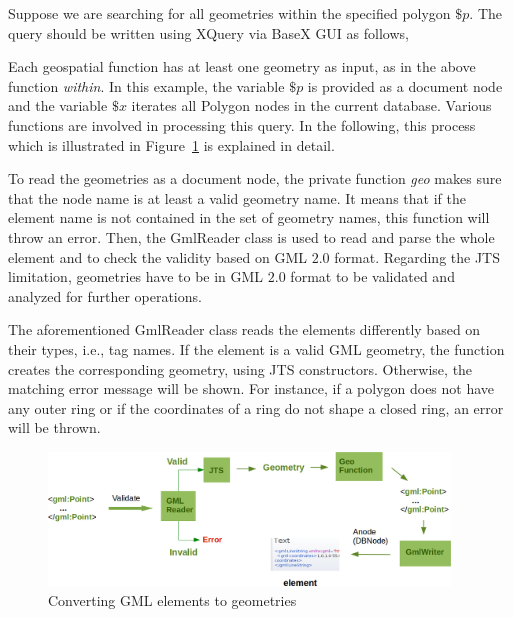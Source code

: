 \documentclass[a4paper,12pt]{article}
\begin{document}
Suppose we are searching for all geometries within the specified polygon $\$p$. The query should be written using XQuery via BaseX GUI as follows,
\vspace{10px}
\vspace{10px}
Each geospatial function has at least one geometry as input, as in the above function \textit{within}. In this example, the variable $\$p$ is provided as a document node and the variable $\$x$ iterates all Polygon nodes in the current database. Various functions are involved in processing this query. In the following, this process which is illustrated in Figure~\ref{figGeoModuleProcess} is explained in detail. 

To read the geometries as a document node, the private function \textit{geo} makes sure that the node name is at least a valid geometry name. It means that if the element name is not contained in the set of geometry names, this function will throw an error. 
Then, the GmlReader class is used to read and parse the whole element and to check the validity based on GML $2.0$ format. Regarding the JTS limitation, geometries have to be in GML $2.0$ format to be validated and analyzed for further operations. 

The aforementioned GmlReader class reads the elements differently based on their types, i.e., tag names. If the element is a valid GML geometry, the function creates the corresponding geometry, using JTS constructors. Otherwise, the matching error message will be shown. For instance, if a polygon does not have any outer ring or if the coordinates of a ring do not shape a closed ring, an error will be thrown. 

 \begin{figure}
\centering
\includegraphics[width=0.95\textwidth]{GeoModuleProcess}
\caption{Converting GML elements to geometries}
\label{figGeoModuleProcess}
\end{figure}
\end{document}
